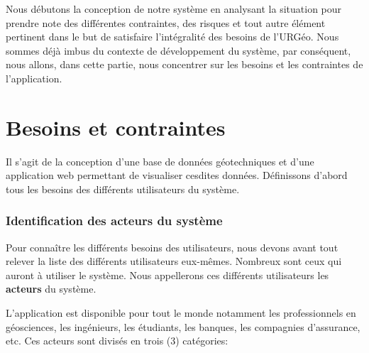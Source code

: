 Nous débutons la conception de notre système en analysant la
situation pour prendre note des différentes contraintes, des risques
et tout autre élément pertinent dans le but de satisfaire l'intégralité
des besoins de l'URGéo.  Nous sommes déjà imbus du contexte de développement
du système, par conséquent, nous allons, dans cette partie, nous concentrer
sur les besoins et les contraintes de l'application.
\section{Besoins et contraintes}
        Il s'agit de la conception d'une base de données géotechniques et d'une
        application web permettant de visualiser cesdites données. Définissons
        d'abord tous les besoins des différents utilisateurs du système.
        \subsubsection{Identification des acteurs du système}
        Pour connaître les différents besoins des utilisateurs, nous devons
        avant tout relever la liste des différents utilisateurs eux-mêmes.
        Nombreux sont ceux qui auront à utiliser le système. Nous appellerons ces différents
        utilisateurs  les \textbf{acteurs} du système.
        \par
        L'application est disponible pour tout le monde notamment les
        professionnels en géosciences, les ingénieurs, les étudiants, les banques, les 
        compagnies d'assurance, etc.
        Ces acteurs sont divisés en trois (3) catégories:
